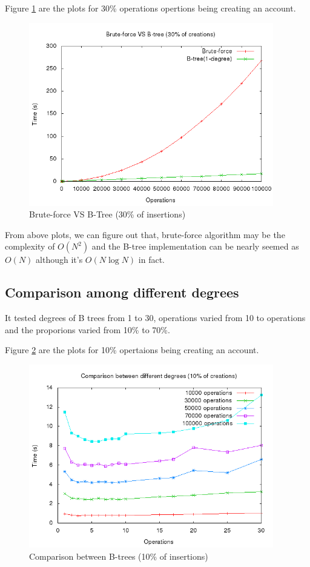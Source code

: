 \documentclass[a4paper, 11pt]{article}
\begin{document}
Figure \ref{bruteVSbtree30} are the plots for 30\% operations opertions being creating an account.
\begin{figure}[htbp]
  \centering
  \includegraphics[width=0.95\textwidth]{./plots/bruteVSbtree30.png}
  \caption{Brute-force VS B-Tree (30\% of insertions)}
  \label{bruteVSbtree30}
\end{figure}

From above plots, we can figure out that, brute-force algorithm may be the complexity of $O(N^2)$ and the B-tree implementation can be nearly seemed as $O(N)$ although it's $O(N\log{N})$ in fact.

\subsection{Comparison among different degrees}
It tested degrees of B trees from 1 to 30, operations varied from 10 to operations and the proporions varied from 10\% to 70\%.

Figure \ref{cmpLOT10} are the plots for 10\% opertaions being creating an account.
\begin{figure}[htbp]
  \centering
  \includegraphics[width=0.95\textwidth]{./plots/cmpLOT10.png}
  \caption{Comparison between B-trees (10\% of insertions)}
  \label{cmpLOT10}
\end{figure}
\end{document}
